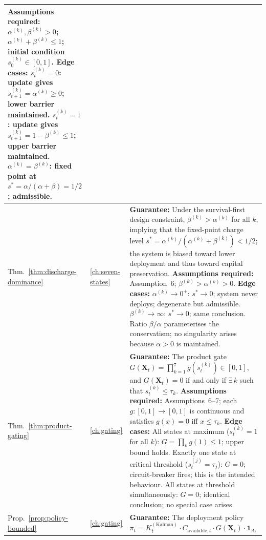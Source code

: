 \documentclass[12pt,openany]{book}
\numberwithin{equation}{chapter}
\theoremstyle{plain}
\theoremstyle{definition}
\theoremstyle{remark}
\def\mathcal#1{#1}%
\begin{document}
\begin{table}[H]
\begin{tabularx}{\linewidth}{@{} l l X @{}}
    \newline
    \textbf{Assumptions required:} $\alpha^{(k)},\beta^{(k)} > 0$;
    $\alpha^{(k)}+\beta^{(k)} \le 1$; initial condition
    $s^{(k)}_0 \in [0,1]$.
    \newline
    \textbf{Edge cases:} $s^{(k)}_t = 0$: update gives
    $s^{(k)}_{t+1} = \alpha^{(k)} \ge 0$; lower barrier maintained.
    $s^{(k)}_t = 1$: update gives
    $s^{(k)}_{t+1} = 1 - \beta^{(k)} \le 1$; upper barrier
    maintained.  $\alpha^{(k)} = \beta^{(k)}$: fixed point at
    $s^* = \alpha/(\alpha+\beta) = 1/2$; admissible. \\
\midrule
Thm.~\ref{thm:discharge-dominance}
  & \ref{ch:seven-states}
  & \textbf{Guarantee:} Under the survival-first design constraint,
    $\beta^{(k)} > \alpha^{(k)}$ for all $k$, implying that
    the fixed-point charge level $s^* = \alpha^{(k)}/
    (\alpha^{(k)}+\beta^{(k)}) < 1/2$; the system is biased toward
    lower deployment and thus toward capital preservation.
    \newline
    \textbf{Assumptions required:} Assumption~6;
    $\beta^{(k)} > \alpha^{(k)} > 0$.
    \newline
    \textbf{Edge cases:} $\alpha^{(k)} \to 0^+$: $s^* \to 0$;
    system never deploys; degenerate but admissible.
    $\beta^{(k)} \to \infty$: $s^* \to 0$; same conclusion.
    Ratio $\beta/\alpha$ parameterises the conservatism; no
    singularity arises because $\alpha > 0$ is maintained. \\
\midrule
Thm.~\ref{thm:product-gating}
  & \ref{ch:gating}
  & \textbf{Guarantee:} The product gate
    $G(\mathbf{X}_t) = \prod_{k=1}^{7} g\!\left(s^{(k)}_t\right)
    \in [0,1]$, and $G(\mathbf{X}_t) = 0$ if and only if
    $\exists\, k$ such that $s^{(k)}_t \le \tau_k$.
    \newline
    \textbf{Assumptions required:} Assumptions~6--7; each
    $g:[0,1]\to[0,1]$ is continuous and satisfies $g(x) = 0$
    iff $x \le \tau_k$.
    \newline
    \textbf{Edge cases:} All states at maximum ($s^{(k)}_t = 1$
    for all $k$): $G = \prod_k g(1) \le 1$; upper bound holds.
    Exactly one state at critical threshold ($s^{(j)}_t = \tau_j$):
    $G = 0$; circuit-breaker fires; this is the intended behaviour.
    All states at threshold simultaneously: $G = 0$; identical
    conclusion; no special case arises. \\
\midrule
Prop.~\ref{prop:policy-bounded}
  & \ref{ch:gating}
  & \textbf{Guarantee:} The deployment policy
    $\pi_t = K_t^{(\mathrm{Kalman})} \cdot C_{\mathrm{available},t} \cdot G(\mathbf{X}_t) \cdot \mathbf{1}_{\mathcal{A}_t}$

\end{tabularx}
\end{table}
\end{document}
